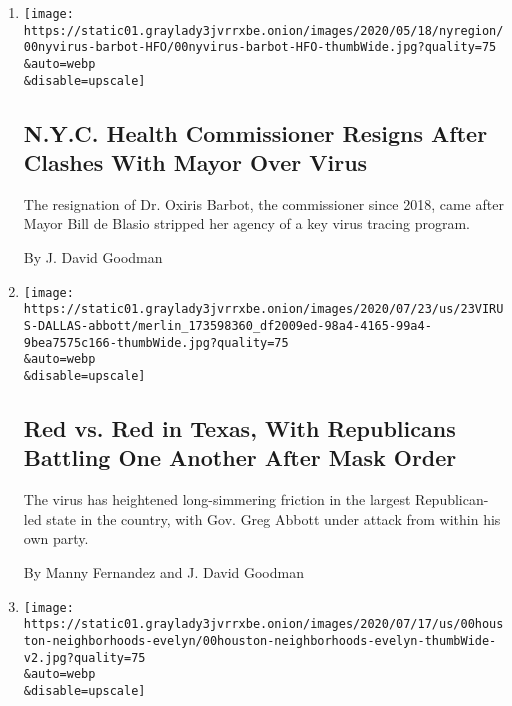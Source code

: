\begin{enumerate}
\def\labelenumi{\arabic{enumi}.}
\item
  \href{/2020/08/04/nyregion/oxiris-barbot-health-commissioner-resigns.html}{}

  \texttt{[image: https://static01.graylady3jvrrxbe.onion/images/2020/05/18/nyregion/00nyvirus-barbot-HFO/00nyvirus-barbot-HFO-thumbWide.jpg?quality=75\\\&auto=webp\\\&disable=upscale]}

  \hypertarget{nyc-health-commissioner-resigns-after-clashes-with-mayor-over-virus}{%
  \subsection{N.Y.C. Health Commissioner Resigns After Clashes With
  Mayor Over
  Virus}\label{nyc-health-commissioner-resigns-after-clashes-with-mayor-over-virus}}

  The resignation of Dr. Oxiris Barbot, the commissioner since 2018,
  came after Mayor Bill de Blasio stripped her agency of a key virus
  tracing program.

  By J. David Goodman
\item
  \href{/2020/07/23/us/coronavirus-texas-abbott-republicans.html}{}

  \texttt{[image: https://static01.graylady3jvrrxbe.onion/images/2020/07/23/us/23VIRUS-DALLAS-abbott/merlin\_173598360\_df2009ed-98a4-4165-99a4-9bea7575c166-thumbWide.jpg?quality=75\\\&auto=webp\\\&disable=upscale]}

  \hypertarget{red-vs-red-in-texas-with-republicans-battling-one-another-after-mask-order}{%
  \subsection{Red vs. Red in Texas, With Republicans Battling One
  Another After Mask
  Order}\label{red-vs-red-in-texas-with-republicans-battling-one-another-after-mask-order}}

  The virus has heightened long-simmering friction in the largest
  Republican-led state in the country, with Gov. Greg Abbott under
  attack from within his own party.

  By Manny Fernandez and J. David Goodman
\item
  \href{/2020/07/21/us/coronavirus-houston-gulfton-bellaire.html}{}

  \texttt{[image: https://static01.graylady3jvrrxbe.onion/images/2020/07/17/us/00houston-neighborhoods-evelyn/00houston-neighborhoods-evelyn-thumbWide-v2.jpg?quality=75\\\&auto=webp\\\&disable=upscale]}


\end{enumerate}
